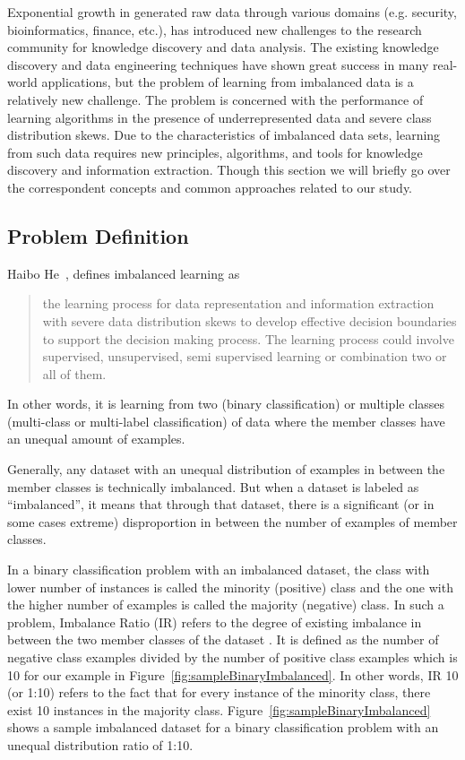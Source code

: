 Exponential growth in generated raw data through various domains (e.g. security, bioinformatics, 
finance, etc.), has introduced new challenges to the research community for knowledge discovery 
and data analysis. The existing knowledge discovery and data engineering techniques have shown 
great success in many real-world applications, but the problem of learning from imbalanced data 
is a relatively new challenge. The problem is concerned with the performance of learning algorithms 
in the presence of underrepresented data and severe class distribution skews. Due to the 
characteristics of imbalanced data sets, learning from such data requires new principles, 
algorithms, and tools for knowledge discovery and information extraction. Though this section 
we will briefly go over the correspondent concepts and common approaches related to our study.

\subsection{Problem Definition}
Haibo He~\cite{haibo_he_learning_2009}, defines imbalanced learning as 
\begin{quote}
the learning process 
for data representation and information extraction with severe data distribution skews to develop 
effective decision boundaries to support the decision making process. The learning process could 
involve supervised, unsupervised, semi supervised learning or combination two or all of them.
\end{quote}
In other words, it is learning from two (binary classification) or multiple classes (multi-class 
or multi-label classification) of data where the member classes have an unequal amount of examples.

Generally, any dataset with an unequal distribution of examples in between the member classes 
is technically imbalanced. But when a dataset is labeled as “imbalanced”, it means that through 
that dataset, there is a significant (or in some cases extreme) disproportion in between the number 
of examples of member classes.

In a binary classification problem with an imbalanced dataset, the class with lower number of 
instances is called the minority (positive) class and the one with the higher number of examples 
is called the majority (negative) class. In such a problem, Imbalance Ratio (IR) refers to the 
degree of existing imbalance in between the two member classes of the dataset \cite{orriols-puig_evolutionary_2009}. 
It is defined as the number of negative class examples divided by the number of positive class 
examples which is 10 for our example in Figure~\ref{fig:sampleBinaryImbalanced}. In other words, 
IR 10 (or 1:10) refers to the fact that for every instance of the minority class, there exist 10 
instances in the majority class.  Figure~\ref{fig:sampleBinaryImbalanced} shows a sample 
imbalanced dataset for a binary classification problem with an unequal distribution ratio of 1:10.

